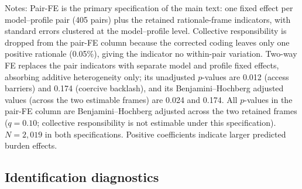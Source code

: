 \begin{table}[htbp]
\centering
\caption{H2 frame--outcome estimates under the primary and secondary specifications}
\label{tab:h2_spec_comparison}
\begin{flushleft}
\footnotesize Notes: Pair-FE is the primary specification of the main text: one fixed effect per model--profile pair (405 pairs) plus the retained rationale-frame indicators, with standard errors clustered at the model--profile level. Collective responsibility is dropped from the pair-FE column because the corrected coding leaves only one positive rationale (0.05\%), giving the indicator no within-pair variation. Two-way FE replaces the pair indicators with separate model and profile fixed effects, absorbing additive heterogeneity only; its unadjusted \(p\)-values are 0.012 (access barriers) and 0.174 (coercive backlash), and its Benjamini--Hochberg adjusted values (across the two estimable frames) are 0.024 and 0.174. All \(p\)-values in the pair-FE column are Benjamini--Hochberg adjusted across the two retained frames (\(q=0.10\); collective responsibility is not estimable under this specification). \(N=2{,}019\) in both specifications. Positive coefficients indicate larger predicted burden effects.
\end{flushleft}
\end{table}

\subsection*{Identification diagnostics}

